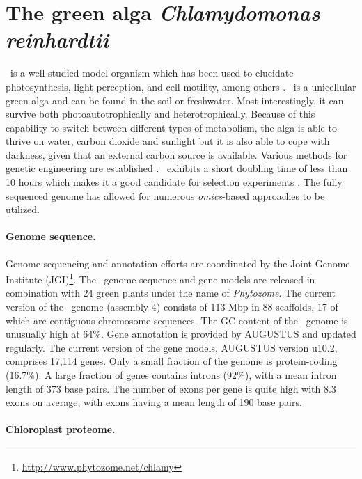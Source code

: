 \section{The green alga {\em Chlamydomonas reinhardtii}}

\chlre~is a well-studied model organism which has been used to elucidate 
photosynthesis, light perception, and cell motility, among others 
\citep{Harris2001}.
\cre~is a unicellular green alga and can be found in the soil or freshwater.
Most interestingly, it can survive both photoautotrophically and 
heterotrophically.
Because of this capability to switch between different types of metabolism, 
the alga is able to thrive on water, carbon dioxide and sunlight but it is
also able to cope with darkness, given that an external carbon source is 
available.
Various methods for genetic engineering are established \citep{Stevens1997}.
\cre~exhibits a short doubling time of less than 10 hours which makes it 
a good candidate for selection experiments \citep{Dent2001}.
The fully sequenced genome \citep{Merchant2007} has allowed for numerous 
{\em omics}-based approaches to be utilized.

\paragraph{Genome sequence.}

Genome sequencing and annotation efforts are coordinated by the Joint Genome 
Institute (JGI)\footnote{\href{http://www.phytozome.net/chlamy}{http://www.phytozome.net/chlamy}}.
The \cre~genome sequence and gene models are released in combination with
24 green plants under the name of {\em Phytozome}.
The current version of the \cre~genome (assembly 4) consists of 113 Mbp in 88 
scaffolds, 17 of which are contiguous chromosome sequences.
The GC content of the \cre~genome is unusually high at 64\%.
Gene annotation is provided by AUGUSTUS and updated regularly.
The current version of the gene models, AUGUSTUS version u10.2, comprises
17,114 genes.
Only a small fraction of the genome is protein-coding (16.7\%).
A large fraction of genes contains introns (92\%), with a mean intron length
of 373 base pairs.
The number of exons per gene is quite high with 8.3 exons on average, with
exons having a mean length of 190 base pairs.

\paragraph{Chloroplast proteome.} 

